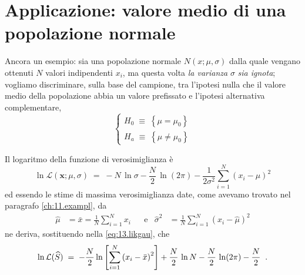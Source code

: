 \section{Applicazione: valore medio di una
  popolazione normale}
Ancora un esempio: sia una popolazione normale $N(x; \mu,
\sigma)$ dalla quale vengano ottenuti $N$ valori
indipendenti $x_i$, ma questa volta \emph{la varianza}
$\sigma$ \emph{sia ignota}; vogliamo discriminare, sulla
base del campione, tra l'ipotesi nulla che il valore medio
della popolazione abbia un valore prefissato e l'ipotesi
alternativa complementare,
\begin{equation*}
  \begin{cases}
    H_0 \; \equiv \; \left\{ \mu = \mu_0 \right\} \\[1ex]
    H_a \; \equiv \; \left\{ \mu \ne \mu_0 \right\}
  \end{cases}
\end{equation*}

Il logaritmo della funzione di verosimiglianza \`e
\begin{equation} \label{eq:13.likgau}
  \ln \mathcal{L} ( \boldsymbol{x}; \mu, \sigma ) \; = \;
    - N \, \ln \sigma - \frac{N}{2} \, \ln ( 2 \pi )
    - \frac{1}{2 \sigma^2} \sum_{i=1}^N ( x_i - \mu)^2
\end{equation}
ed essendo le stime di massima verosimiglianza date, come
avevamo trovato nel paragrafo \ref{ch:11.exampl}, da
\begin{align*}
  \widehat \mu &= \bar x = \frac{1}{N} \sum_{i=1}^N x_i
   &&\text{e} &
   \widehat \sigma^2 &= \frac{1}{N} \sum_{i=1}^N \left( x_i
     - \widehat \mu \right)^2
\end{align*}
ne deriva, sostituendo nella \eqref{eq:13.likgau}, che
\begin{equation*}
  \ln \mathcal{L} (\widehat S) \; = \; - \frac{N}{2} \ln \left[
    \sum_{i=1}^N \left( x_i - \bar x \right)^2 \right] +
    \frac{N}{2} \, \ln N - \frac{N}{2} \, \ln ( 2 \pi ) -
    \frac{N}{2} \;\; .
\end{equation*}

